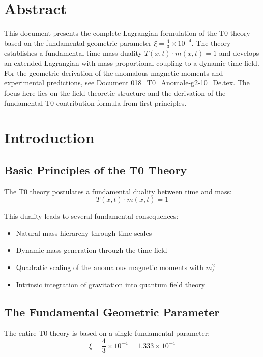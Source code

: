 \section*{Abstract}
		This document presents the complete Lagrangian formulation of the T0 theory based on the fundamental geometric parameter $\xi = \frac{4}{3} \times 10^{-4}$. The theory establishes a fundamental time-mass duality $T(x,t) \cdot m(x,t) = 1$ and develops an extended Lagrangian with mass-proportional coupling to a dynamic time field. For the geometric derivation of the anomalous magnetic moments and experimental predictions, see Document 018\_T0\_Anomale-g2-10\_De.tex. The focus here lies on the field-theoretic structure and the derivation of the fundamental T0 contribution formula from first principles.

	
	
	\section{Introduction}
	
	\subsection{Basic Principles of the T0 Theory}
	
	The T0 theory postulates a fundamental duality between time and mass:
	\begin{equation}
		T(x,t) \cdot m(x,t) = 1
		\label{eq:time_mass_duality}
	\end{equation}
	
	This duality leads to several fundamental consequences:
	\begin{itemize}
		\item Natural mass hierarchy through time scales
		\item Dynamic mass generation through the time field
		\item Quadratic scaling of the anomalous magnetic moments with $m_\ell^2$
		\item Intrinsic integration of gravitation into quantum field theory
	\end{itemize}
	
	\subsection{The Fundamental Geometric Parameter}
	
	The entire T0 theory is based on a single fundamental parameter:
	\begin{equation}
		\boxed{\xi = \frac{4}{3} \times 10^{-4} = 1.333 \times 10^{-4}}
		\label{eq:xi_fundamental}
	\end{equation}
	
